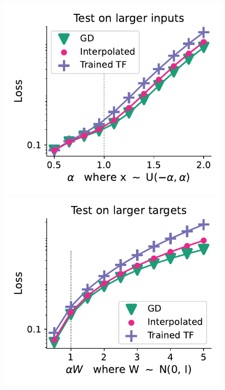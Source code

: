 \documentclass{article}
\theoremstyle{plain}
\theoremstyle{definition}
\theoremstyle{remark}
\begin{document}
\begin{figure}
\begin{center}
\begin{minipage}{.24\textwidth}
\begin{center}
  \end{center}
  \vspace{-10pt}
\end{minipage}
\begin{minipage}{.24\textwidth}
  \centering
  \begin{center}
    \includegraphics[width=1.\textwidth]{Final_figures/cycle/512/normal_27.pdf}
  \end{center}
  \vspace{-10pt}
\end{minipage}
\begin{minipage}{.24\textwidth}
  \centering
  \begin{center}
    \includegraphics[width=1.\textwidth]{Final_figures/cycle/512/normal_28.pdf}
  \end{center}
  \vspace{-10pt}
\end{minipage}
\end{center}


\end{figure}
\end{document}
